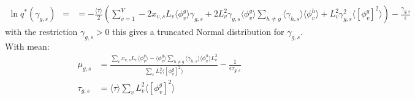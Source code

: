 \documentclass[10pt]{article}
\begin{document}
\begin{align}
\ln q^*(\gamma_{g,s}) & = 
& =  - \frac{\langle \tau \rangle }{2} \left ( \sum_{v=1}^V -2 x_{v,s} L_v \langle \phi^g_{v} \rangle \gamma_{g,s}  
+ 2 L_v^2 \gamma_{g,s} \langle \phi_v^g \rangle \sum_{h \neq g } \langle \gamma_{h,s} \rangle \langle \phi^h_{v} \rangle
+ L_v^2 \gamma_{g,s}^2 \langle [\phi^g_{v}]^2  \rangle
\right)
- \frac{\gamma_{g,s}}{\epsilon}
\end{align}
with the restriction $\gamma_{g,s} > 0$ this gives a truncated Normal distribution for $\gamma_{g,s}$.
With mean:
\begin{align}
\mu_{g,s}  & = \frac{\sum_v x_{v,s} L_v \langle \phi_v^g \rangle  - \langle \phi_v^g \rangle \sum_{h \neq g} \langle \gamma_{h,s} \rangle \langle \phi^h_v\rangle  L_v^2}{\sum_{v} L_v^2  \langle [\phi^g_{v}]^2  \rangle} - \frac{1}{\epsilon \tau_{g,s} }\\
\tau_{g,s} & = \langle \tau \rangle \sum_{v} L_v^2  \langle [\phi^g_{v}]^2  \rangle  \\
\end{align}
\end{document}
